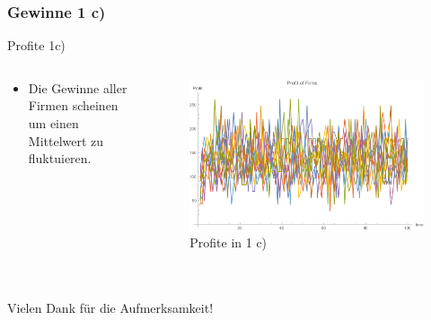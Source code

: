 \documentclass[xcolor={dvipsnames},10pt]{beamer}
\begin{document}
\subsubsection{Gewinne 1 c)}
\begin{frame}{Profite 1c)}
\begin{columns}[T]
    \begin{column}{.3\textwidth}
      \begin{itemize}
      \item Die Gewinne aller Firmen scheinen um einen Mittelwert zu fluktuieren.
      \end{itemize}
      \end{column}
      \begin{column}{.7\textwidth}
      \begin{figure}[t]
            \centering
            \includegraphics[scale=0.35]{../Plots/profit1c}
            \caption{Profite in 1 c)}
            \label{fig:profit1c}
       \end{figure}
    \end{column}
  \end{columns}
\end{frame}

\section*{}
\begin{frame}
\centering
 Vielen Dank für die Aufmerksamkeit!
\end{frame}
\end{document}
